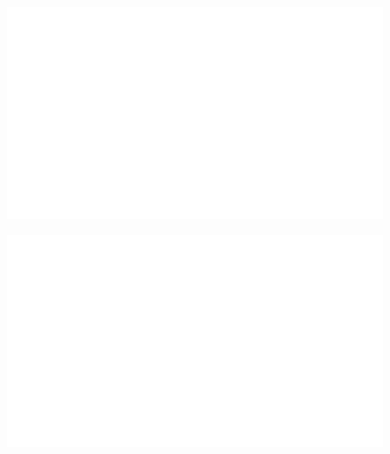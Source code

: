 \begin{centering}
    \begin{figure}[h]
        \centering
        \includegraphics[width=\textwidth]{whyareyoucheckingthenameofthisfile.png}
    \end{figure}
\end{centering}

\begin{centering}
    \begin{figure}
        \centering
        \includegraphics[width=\textwidth]{whyareyoucheckingthenameofthisfile.png}
    \end{figure}
\end{centering}
\noindent